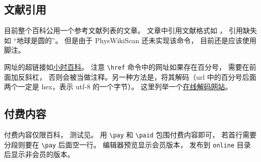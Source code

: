 
\subsection{文献引用}
目前整个百科公用一个参考文献列表的文章。 文章中引用文献格式如 \cite{GriffE}， 引用缺失如 “地球是圆的\needCite”。 但是由于 PhysWikiScan 还未实现该命令， 目前还是应该使用脚注。

网址的超链接如\href{https://wuli.wiki}{小时百科}。 注意 \verb|\href| 命令中的网址如果存在百分号， 需要在前面加反斜杠， 否则会被当做注释。另一种方法是，将其解码（url 中的百分号后面两个一定是 hex，表示 utf-8 的一个字节）。 这里列举一个\href{https://www.webatic.com/url-convertor}{在线解码网站}。

\subsection{付费内容}
付费内容仅限百科， 测试见。 用 \verb|\pay| 和 \verb|\paid| 包围付费内容即可， 若首行需要分段则要在 \verb|\pay| 后面空一行。 编辑器预览显示会员版本， 发布到 \verb|online| 目录后显示非会员的版本。

